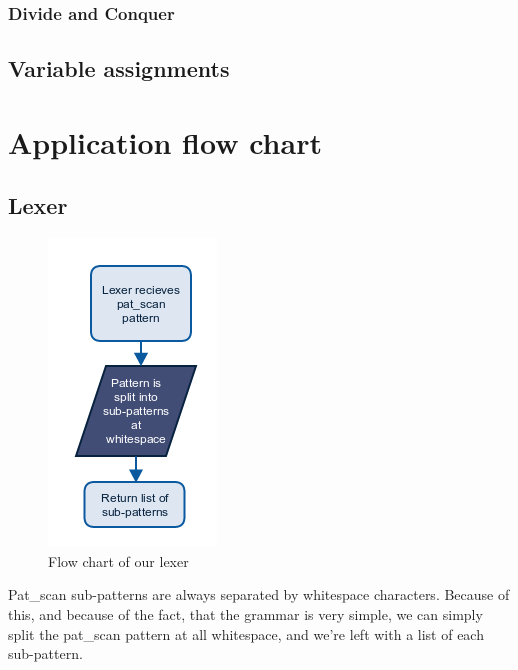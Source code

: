 \documentclass[12pt]{article}
\begin{document}
\subsubsection{Divide and Conquer}

\subsection{Variable assignments}



\section{Application flow chart}

\subsection{Lexer}
\begin{figure}[H]
	\begin{center}
		\includegraphics[scale=1]{lexer.png}
	\end{center}
	\caption{Flow chart of our lexer}
\end{figure}

Pat\_scan sub-patterns are always separated by whitespace characters. Because of this, and because of the fact, that the grammar is very simple, we can simply split the pat\_scan pattern at all whitespace, and we're left with a list of each sub-pattern.
\end{document}
